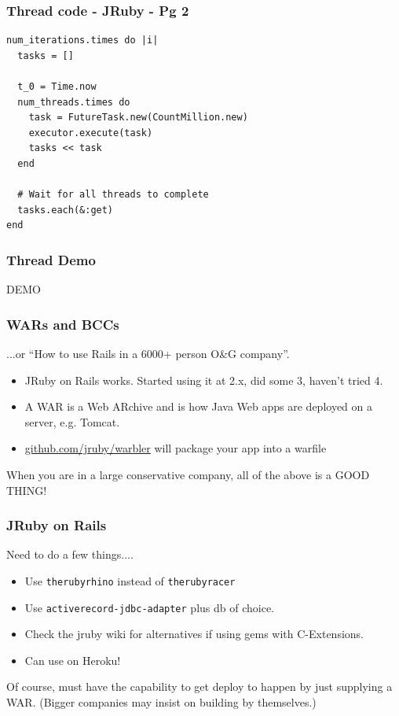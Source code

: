 \begin{frame}[fragile]\frametitle{Thread code - JRuby - Pg 2}
\begin{lstlisting}
num_iterations.times do |i|
  tasks = []

  t_0 = Time.now
  num_threads.times do
    task = FutureTask.new(CountMillion.new)
    executor.execute(task)
    tasks << task
  end

  # Wait for all threads to complete
  tasks.each(&:get)
end
\end{lstlisting}
\end{frame}
\begin{frame}\frametitle{Thread Demo}
  \begin{center}
  {\Huge DEMO}
  \end{center}
\end{frame}
\begin{frame}\frametitle{WARs and BCCs}
  ...or ``How to use Rails in a 6000+ person O\&G company''.
  \begin{itemize}
    \item JRuby on Rails works. Started using it at 2.x, did some 3, haven't tried 4.
    \item A WAR is a Web ARchive and is how Java Web apps are deployed on a server, e.g. Tomcat.
    \item \url{github.com/jruby/warbler} will package your app into a warfile
  \end{itemize}
  When you are in a large conservative company, all of the above is a GOOD THING!
\end{frame}
\begin{frame}\frametitle{JRuby on Rails}
  Need to do a few things....
  \begin{itemize}
    \item Use \texttt{therubyrhino} instead of \texttt{therubyracer}
    \item Use \texttt{activerecord-jdbc-adapter} plus db of choice.
    \item Check the jruby wiki for alternatives if using gems with C-Extensions.
    \item Can use on Heroku!
  \end{itemize}
  Of course, must have the capability to get deploy to happen by just supplying a WAR. (Bigger
  companies may insist on building by themselves.)
\end{frame}
